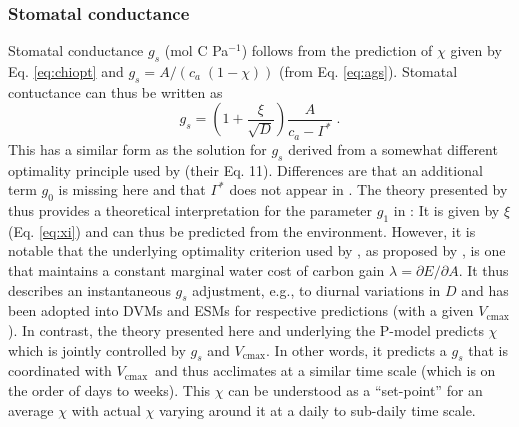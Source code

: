 \documentclass{myreport}
\newcommand{\vcmax}{$V_{\text{cmax}}$}
\begin{document}
\subsubsection{Stomatal conductance}
\label{sec:gs}
Stomatal conductance $g_s$ (mol C Pa$^{-1}$) follows from the prediction of $\chi$ given by Eq. \ref{eq:chiopt} and $g_s = A / ( c_a\;(1-\chi) )$ (from Eq. \ref{eq:ags}). Stomatal contuctance can thus be written as
\begin{equation}
\label{eq:gs}
    g_s = \left( 1 + \frac{\xi}{\sqrt{D}} \right) \frac{A}{c_a - \Gamma^\ast}\;.
\end{equation}
This has a similar form as the solution for $g_s$ derived from a somewhat different optimality principle used by \citet{medlyn11gcb} (their Eq. 11). Differences are that an additional term $g_0$ is missing here and that $\Gamma^\ast$ does not appear in \citet{medlyn11gcb}. The theory presented by \citet{prentice14ecollett} thus provides a theoretical interpretation for the parameter $g_1$ in \citet{medlyn11gcb}: It is given by $\xi$ (Eq. \ref{eq:xi}) and can thus be predicted from the environment. However, it is notable that the underlying optimality criterion used by \citet{medlyn11gcb}, as proposed by \citet{Cowan1977-ud}, is one that maintains a constant marginal water cost of carbon gain $\lambda = \partial E / \partial A$. It thus describes an instantaneous $g_s$ adjustment, e.g., to diurnal variations in $D$ and has been adopted into DVMs and ESMs for respective predictions (with a given \vcmax ). In contrast, the theory presented here and underlying the P-model predicts $\chi$ which is jointly controlled by $g_s$ and \vcmax . In other words, it predicts a $g_s$ that is coordinated with \vcmax\ and thus acclimates at a similar time scale (which is on the order of days to weeks). This $\chi$ can be understood as a ``set-point'' for an average $\chi$ with actual $\chi$ varying around it at a daily to sub-daily time scale.

\end{document}
